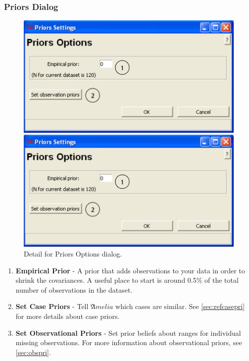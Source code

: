 \documentclass[12pt,titlepage]{article}
\begin{document}
\subsubsection{Priors Dialog}
\label{sec:pridiag}
\begin{figure}[ht]
  \centering
 \begin{htmlonly} 
   \includegraphics[scale=1]{priors} 
 \end{htmlonly}
 \begin{latexonly}
   \includegraphics[scale=.75]{priors}
 \end{latexonly}
  \caption{Detail for Priors Options dialog.}
\end{figure}
\begin{enumerate}
\item \textbf{Empirical Prior} - A prior that adds observations to
  your data in order to shrink the covariances.  A useful place to
  start is around 0.5\% of the total number of observations in the dataset.
\item \textbf{Set Case Priors} -
  Tell ${\mathfrak Amelia}$ which cases are similar.  See
  \ref{sec:refcasepri} for more details about case priors.
\item \textbf{Set Observational Priors} - Set prior beliefs about 
 ranges for individual missing observations.  For more information 
 about observational priors, see \ref{sec:obspri}.
\end{enumerate}
\end{document}
